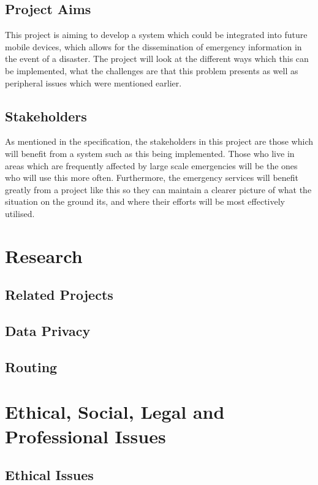 \documentclass{report}
\begin{document}
\section{Project Aims}
This project is aiming to develop a system which could be integrated into future mobile devices, which allows for the dissemination of emergency information in the event of a disaster. The project will look at the different ways which this can be implemented, what the challenges are that this problem presents as well as peripheral issues which were mentioned earlier.  

\section{Stakeholders}
As mentioned in the specification, the stakeholders in this project are those which will benefit from a system such as this being implemented. Those who live in areas which are frequently affected by large scale emergencies will be the ones who will use this more often. Furthermore, the emergency services will benefit greatly from a project like this so they can maintain a clearer picture of what the situation on the ground its, and where their efforts will be most effectively utilised.  

\chapter{Research}

\section{Related Projects}
 

\section{Data Privacy}


\section{Routing}


\chapter{Ethical, Social, Legal and Professional Issues}

\section{Ethical Issues}
\end{document}
